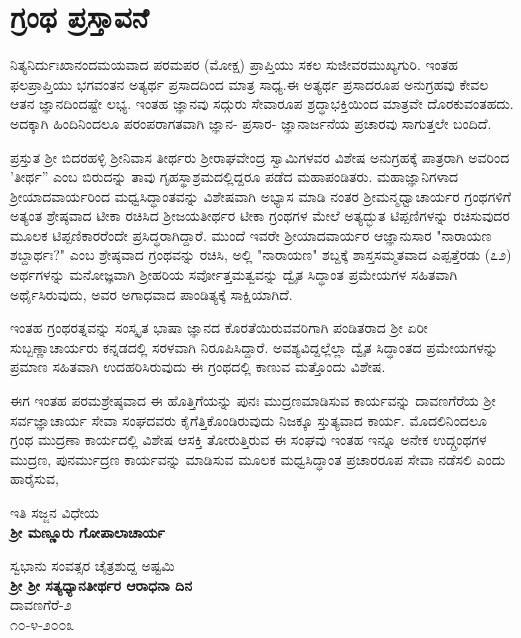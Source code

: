 

\begin{center}
\end{center}

\chapter*{ಗ್ರಂಥ ಪ್ರಸ್ತಾವನೆ}

\vskip -10pt

ನಿತ್ಯನಿರ್ದುಃಖಾನಂದಮಯವಾದ ಪರಮಪರ (ಮೋಕ್ಷ) ಪ್ರಾಪ್ತಿಯು ಸಕಲ ಸುಜೀವರ\break ಮುಖ್ಯಗುರಿ. ಇಂತಹ ಫಲಪ್ರಾಪ್ತಿಯು ಭಗವಂತನ ಅತ್ಯರ್ಥ ಪ್ರಸಾದದಿಂದ ಮಾತ್ರ ಸಾಧ್ಯ.\break ಈ ಅತ್ಯರ್ಥ ಪ್ರಸಾದರೂಪ ಅನುಗ್ರಹವು ಕೇವಲ ಆತನ ಜ್ಞಾನದಿಂದಷ್ಟೇ ಲಭ್ಯ. ಇಂತಹ ಜ್ಞಾನವು ಸದ್ಗುರು ಸೇವಾರೂಪ ಶ್ರದ್ಧಾಭಕ್ತಿಯಿಂದ ಮಾತ್ರವೇ ದೊರಕುವಂತಹದು. ಅದಕ್ಕಾಗಿ ಹಿಂದಿನಿಂದಲೂ ಪರಂಪರಾಗತವಾಗಿ ಜ್ಞಾನ- ಪ್ರಸಾರ- ಜ್ಞಾನಾರ್ಜನೆಯ ಪ್ರಚಾರವು ಸಾಗು\-ತ್ತಲೇ ಬಂದಿದೆ.

\vskip 4pt

ಪ್ರಸ್ತುತ ಶ‍್ರೀ ಬಿದರಹಳ್ಳಿ ಶ‍್ರೀನಿವಾಸ ತೀರ್ಥರು ಶ‍್ರೀರಾಘವೇಂದ್ರ ಸ್ವಾಮಿಗಳವರ ವಿಶೇಷ ಅನುಗ್ರಹಕ್ಕೆ ಪಾತ್ರರಾಗಿ ಅವರಿಂದ 'ತೀರ್ಥ'' ಎಂಬ ಬಿರುದನ್ನು ತಾವು ಗೃಹಸ್ಥಾ\-ಶ್ರಮದಲ್ಲಿದ್ದರೂ ಪಡೆದ ಮಹಾಪಂಡಿತರು. ಮಹಾಜ್ಞಾನಿಗಳಾದ ಶ‍್ರೀಯಾದವಾರ್ಯರಿಂದ ಮಧ್ವಸಿದ್ಧಾಂತವನ್ನು ವಿಶೇಷವಾಗಿ ಅಭ್ಯಾಸ ಮಾಡಿ ನಂತರ ಶ‍್ರೀಮನ್ಮಧ್ವಾಚಾರ್ಯರ ಗ್ರಂಥಗಳಿಗೆ ಅತ್ಯಂತ ಶ್ರೇಷ್ಠವಾದ ಟೀಕಾ ರಚಿಸಿದ ಶ‍್ರೀಜಯತೀರ್ಥರ ಟೀಕಾ ಗ್ರಂಥಗಳ ಮೇಲೆ ಅತ್ಯದ್ಭುತ ಟಿಪ್ಪಣಿಗಳನ್ನು ರಚಿಸುವುದರ ಮೂಲಕ ಟಿಪ್ಪಣಿಕಾರರೆಂದೇ ಪ್ರಸಿದ್ಧರಾಗಿದ್ದಾರೆ. ಮುಂದೆ ಇವರೇ ಶ‍್ರೀಯಾದವಾರ್ಯರ ಆಜ್ಞಾನುಸಾರ "ನಾರಾಯಣ ಶಬ್ದಾರ್ಥಃ?" ಎಂಬ ಶ್ರೇಷ್ಠವಾದ ಗ್ರಂಥವನ್ನು ರಚಿಸಿ, ಅಲ್ಲಿ "ನಾರಾಯಣ" ಶಬ್ದಕ್ಕೆ ಶಾಸ್ತಸಮ್ಮತವಾದ ಎಪ್ಪತ್ತೆರಡು (೭೨) ಅರ್ಥಗಳನ್ನು ಮನೋಜ್ಞವಾಗಿ ಶ‍್ರೀಹರಿಯ ಸರ್ವೋತ್ತಮತ್ವವನ್ನು ದ್ವೈತ ಸಿದ್ಧಾಂತ ಪ್ರಮೇಯಗಳ ಸಹಿತವಾಗಿ ಅರ್ಥೈಸಿರುವುದು, ಅವರ ಅಗಾಧವಾದ ಪಾಂಡಿತ್ಯಕ್ಕೆ ಸಾಕ್ಷಿಯಾಗಿದೆ.

\vskip 4pt

ಇಂತಹ ಗ್ರಂಥರತ್ನವನ್ನು ಸಂಸ್ಕೃತ ಭಾಷಾ ಜ್ಞಾನದ ಕೊರತೆಯಿರುವವರಿಗಾಗಿ ಪಂಡಿತರಾದ ಶ‍್ರೀ ಏರೀ ಸುಬ್ಬಣ್ಣಾಚಾರ್ಯರು ಕನ್ನಡದಲ್ಲಿ ಸರಳವಾಗಿ ನಿರೂಪಿಸಿದ್ದಾರೆ. ಅವಶ್ಯವಿದ್ದಲ್ಲೆಲ್ಲಾ ದ್ವೈತ ಸಿದ್ಧಾಂತದ ಪ್ರಮೇಯಗಳನ್ನು ಪ್ರಮಾಣ ಸಹಿತವಾಗಿ ಉದಹರಿಸಿರುವುದು ಈ ಗ್ರಂಥದಲ್ಲಿ ಕಾಣುವ ಮತ್ತೊಂದು ವಿಶೇಷ.

ಈಗ ಇಂತಹ ಪರಮಶ್ರೇಷ್ಠವಾದ ಈ ಹೊತ್ತಿಗೆಯನ್ನು ಪುನಃ ಮುದ್ರಣಮಾಡಿಸುವ ಕಾರ್ಯವನ್ನು ದಾವಣಗೆರೆಯ ಶ‍್ರೀ ಸರ್ವಜ್ಞಾಚಾರ್ಯ ಸೇವಾ ಸಂಘದವರು ಕೈಗೆತ್ತಿಕೊಂಡಿರುವುದು ನಿಜಕ್ಕೂ ಸ್ತುತ್ಯವಾದ ಕಾರ್ಯ. ಮೊದಲಿನಿಂದಲೂ ಗ್ರಂಥ ಮುದ್ರಣಾ ಕಾರ್ಯದಲ್ಲಿ ವಿಶೇಷ ಆಸಕ್ತಿ ತೋರುತ್ತಿರುವ ಈ ಸಂಘವು ಇಂತಹ ಇನ್ನೂ ಅನೇಕ ಉದ್ಗ್ರಂಥಗಳ ಮುದ್ರಣ, ಪುನರ್ಮುದ್ರಣ ಕಾರ್ಯವನ್ನು ಮಾಡಿಸುವ ಮೂಲಕ ಮಧ್ವಸಿದ್ಧಾಂತ ಪ್ರಚಾರರೂಪ ಸೇವಾ ನಡೆಸಲಿ ಎಂದು ಹಾರೈಸುವ,

\begin{flushright}
ಇತಿ ಸಜ್ಜನ ವಿಧೇಯ\\\textbf{ಶ‍್ರೀ ಮಣ್ಣೂರು ಗೋಪಾಲಾಚಾರ್ಯ}
\end{flushright}

\noindent
ಸ್ವಭಾನು ಸಂವತ್ಸರ ಚೈತ್ರಶುದ್ದ ಅಷ್ಟಮಿ\\\textbf{ಶ‍್ರೀ ಶ‍್ರೀ ಸತ್ಯಧ್ಯಾನತೀರ್ಥರ ಆರಾಧನಾ ದಿನ}\\ ದಾವಣಗೆರೆ-೨\\ ೧೦-೪-೨೦೦೩

